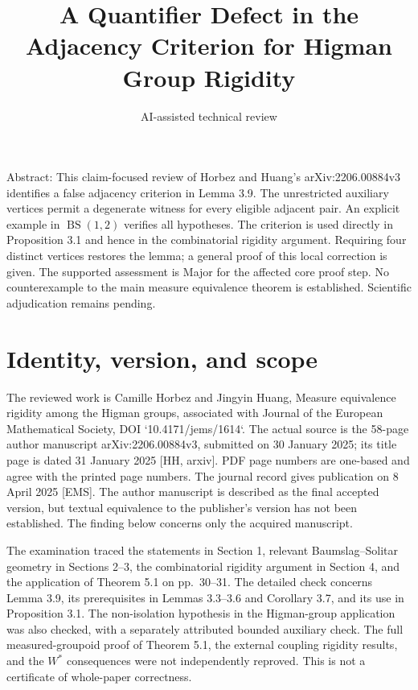 \documentclass[10pt]{article}
\title{A Quantifier Defect in the Adjacency Criterion
for Higman Group Rigidity}
\author{AI-assisted technical review}
\date{}
\begin{document}
\maketitle
Abstract: This claim-focused review of Horbez and Huang’s arXiv:2206.00884v3 identifies a false adjacency criterion in Lemma 3.9. The unrestricted auxiliary vertices permit a degenerate witness for every eligible adjacent pair. An explicit example in \(\operatorname{BS}(1,2)\) verifies all hypotheses. The criterion is used directly in Proposition 3.1 and hence in the combinatorial rigidity argument. Requiring four distinct vertices restores the lemma; a general proof of this local correction is given. The supported assessment is Major for the affected core proof step. No counterexample to the main measure equivalence theorem is established. Scientific adjudication remains pending.\par
\section*{Identity, version, and scope}
The reviewed work is Camille Horbez and Jingyin Huang, Measure equivalence rigidity among the Higman groups, associated with Journal of the European Mathematical Society, DOI `10.4171/jems/1614`. The actual source is the 58-page author manuscript arXiv:2206.00884v3, submitted on 30 January 2025; its title page is dated 31 January 2025 [HH, arxiv]. PDF page numbers are one-based and agree with the printed page numbers. The journal record gives publication on 8 April 2025 [EMS]. The author manuscript is described as the final accepted version, but textual equivalence to the publisher’s version has not been established. The finding below concerns only the acquired manuscript.\par
The examination traced the statements in Section 1, relevant Baumslag–Solitar geometry in Sections 2–3, the combinatorial rigidity argument in Section 4, and the application of Theorem 5.1 on pp. 30–31. The detailed check concerns Lemma 3.9, its prerequisites in Lemmas 3.3–3.6 and Corollary 3.7, and its use in Proposition 3.1. The non-isolation hypothesis in the Higman-group application was also checked, with a separately attributed bounded auxiliary check. The full measured-groupoid proof of Theorem 5.1, the external coupling rigidity results, and the \(W^*\) consequences were not independently reproved. This is not a certificate of whole-paper correctness.\par
\end{document}
